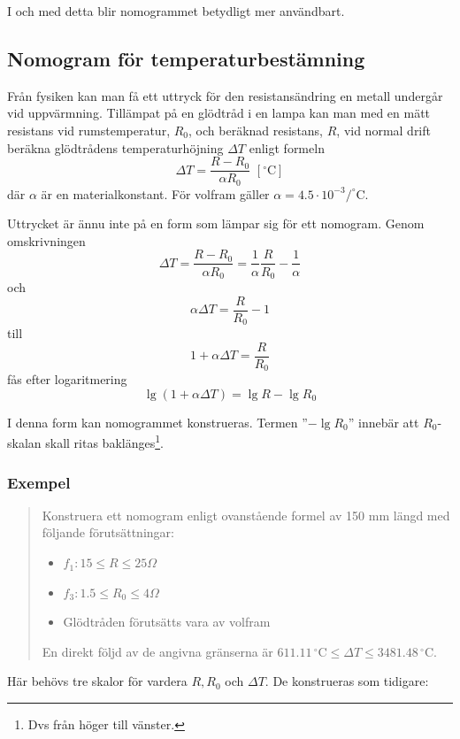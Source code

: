 \documentclass[oneside,11pt,a4paper,swedish]{scrbook}
\newcommand{\startex}[1]{\subsubsection{Exempel}\begin{quote}#1\end{quote}}
\begin{document}
I och med detta blir nomogrammet betydligt mer användbart.

\subsection{Nomogram för temperaturbestämning}
Från fysiken kan man få ett uttryck för den resistansändring en metall undergår vid uppvärmning. Tillämpat på en glödtråd i en lampa kan man med en mätt resistans vid rumstemperatur, $R_0$, och beräknad resistans, $R$, vid normal drift beräkna glödtrådens temperaturhöjning $\Delta T$ enligt formeln \[ \Delta T = \frac{R-R_0}{\alpha R_0} \,\, [^\circ\textrm{C}]\] där $\alpha$ är en materialkonstant. För volfram gäller $\alpha = 4.5\cdot 10^{-3}/^\circ$C.

Uttrycket är ännu inte på en form som lämpar sig för ett nomogram. Genom omskrivningen \[ \Delta T = \frac{R-R_0}{\alpha R_0} = \frac{1}{\alpha} \frac{R}{R_0}-\frac{1}{\alpha}\] och \[ \alpha \Delta T =  \frac{R}{R_0}-1\] till \[ 1+ \alpha \Delta T =  \frac{R}{R_0}\] fås efter logaritmering \[ \lg (1+ \alpha \Delta T) =  \lg R-\lg R_0\]

I denna form kan nomogrammet konstrueras. Termen ''$-\lg R_0$'' innebär att $R_0$-skalan skall ritas baklänges\footnote{Dvs från höger till vänster.}.

\startex{Konstruera ett nomogram enligt ovanstående formel av 150 mm längd med följande förutsättningar:
\begin{itemize}
\item $f_1: 15 \leq R \leq 25 \Omega$
\item $f_3: 1.5 \leq R_0 \leq 4 \Omega$
\item Glödtråden förutsätts vara av volfram
\end{itemize}

En direkt följd av de angivna gränserna är $611.11\,^\circ\textrm{C}\leq \Delta T \leq 3481.48\,^\circ\textrm{C}$.
}

Här behövs tre skalor för vardera $R, R_0$ och $\Delta T$. De konstrueras som tidigare: 
\end{document}
